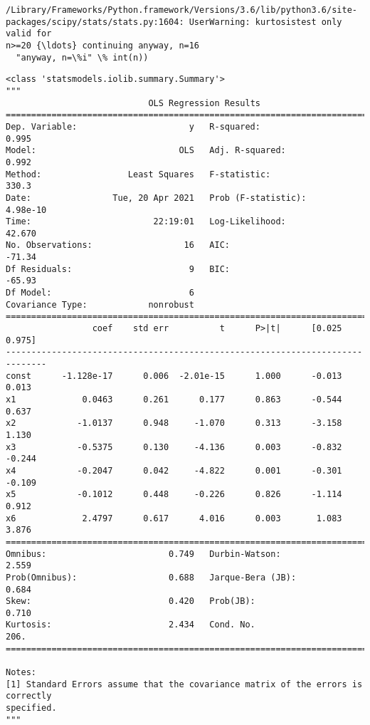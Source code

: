 \documentclass[11pt]{ctexart}
\makeatletter
\newcommand{\boxspacing}{\kern\kvtcb@left@rule\kern\kvtcb@boxsep}
\newcommand{\prompt}[4]{
        {\ttfamily\llap{{\color{#2}[#3]:\hspace{3pt}#4}}\vspace{-\baselineskip}}
    }
\makeatother
\begin{document}
    \begin{Verbatim}[commandchars=\\\{\}]
/Library/Frameworks/Python.framework/Versions/3.6/lib/python3.6/site-
packages/scipy/stats/stats.py:1604: UserWarning: kurtosistest only valid for
n>=20 {\ldots} continuing anyway, n=16
  "anyway, n=\%i" \% int(n))
    \end{Verbatim}

            \begin{tcolorbox}[breakable, size=fbox, boxrule=.5pt, pad at break*=1mm, opacityfill=0]
\prompt{Out}{outcolor}{4}{\boxspacing}
\begin{Verbatim}[commandchars=\\\{\}]
<class 'statsmodels.iolib.summary.Summary'>
"""
                            OLS Regression Results
==============================================================================
Dep. Variable:                      y   R-squared:                       0.995
Model:                            OLS   Adj. R-squared:                  0.992
Method:                 Least Squares   F-statistic:                     330.3
Date:                Tue, 20 Apr 2021   Prob (F-statistic):           4.98e-10
Time:                        22:19:01   Log-Likelihood:                 42.670
No. Observations:                  16   AIC:                            -71.34
Df Residuals:                       9   BIC:                            -65.93
Df Model:                           6
Covariance Type:            nonrobust
==============================================================================
                 coef    std err          t      P>|t|      [0.025      0.975]
------------------------------------------------------------------------------
const      -1.128e-17      0.006  -2.01e-15      1.000      -0.013       0.013
x1             0.0463      0.261      0.177      0.863      -0.544       0.637
x2            -1.0137      0.948     -1.070      0.313      -3.158       1.130
x3            -0.5375      0.130     -4.136      0.003      -0.832      -0.244
x4            -0.2047      0.042     -4.822      0.001      -0.301      -0.109
x5            -0.1012      0.448     -0.226      0.826      -1.114       0.912
x6             2.4797      0.617      4.016      0.003       1.083       3.876
==============================================================================
Omnibus:                        0.749   Durbin-Watson:                   2.559
Prob(Omnibus):                  0.688   Jarque-Bera (JB):                0.684
Skew:                           0.420   Prob(JB):                        0.710
Kurtosis:                       2.434   Cond. No.                         206.
==============================================================================

Notes:
[1] Standard Errors assume that the covariance matrix of the errors is correctly
specified.
"""
\end{Verbatim}
\end{tcolorbox}
        
\end{document}
